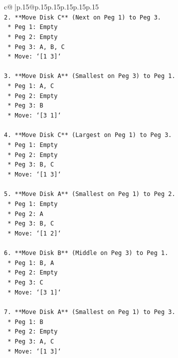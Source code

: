 \documentclass{article}
\begin{document}
{\begin{supertabular}{c@{$\;$}|p{.15\linewidth}@{}p{.15\linewidth}p{.15\linewidth}p{.15\linewidth}p{.15\linewidth}p{.15\linewidth}}
{{{\\ 
\texttt{2.  **Move Disk C** (Next on Peg 1) to Peg 3.} \\
\texttt{    *   Peg 1: Empty} \\
\texttt{    *   Peg 2: Empty} \\
\texttt{    *   Peg 3: A, B, C} \\
\texttt{    *   Move: `{[}1 3{]}`} \\
\\ 
\texttt{3.  **Move Disk A** (Smallest on Peg 3) to Peg 1.} \\
\texttt{    *   Peg 1: A, C} \\
\texttt{    *   Peg 2: Empty} \\
\texttt{    *   Peg 3: B} \\
\texttt{    *   Move: `{[}3 1{]}`} \\
\\ 
\texttt{4.  **Move Disk C** (Largest on Peg 1) to Peg 3.} \\
\texttt{    *   Peg 1: Empty} \\
\texttt{    *   Peg 2: Empty} \\
\texttt{    *   Peg 3: B, C} \\
\texttt{    *   Move: `{[}1 3{]}`} \\
\\ 
\texttt{5.  **Move Disk A** (Smallest on Peg 1) to Peg 2.} \\
\texttt{    *   Peg 1: Empty} \\
\texttt{    *   Peg 2: A} \\
\texttt{    *   Peg 3: B, C} \\
\texttt{    *   Move: `{[}1 2{]}`} \\
\\ 
\texttt{6.  **Move Disk B** (Middle on Peg 3) to Peg 1.} \\
\texttt{    *   Peg 1: B, A} \\
\texttt{    *   Peg 2: Empty} \\
\texttt{    *   Peg 3: C} \\
\texttt{    *   Move: `{[}3 1{]}`} \\
\\ 
\texttt{7.  **Move Disk A** (Smallest on Peg 1) to Peg 3.} \\
\texttt{    *   Peg 1: B} \\
\texttt{    *   Peg 2: Empty} \\
\texttt{    *   Peg 3: A, C} \\
\texttt{    *   Move: `{[}1 3{]}`} \\
}}}
\end{supertabular}}
\end{document}

